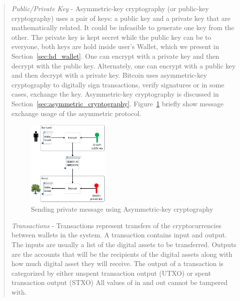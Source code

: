 \begin{itemize}
\begin{quote}
          \emph{Public/Private Key} -
          Asymmetric-key cryptography (or public-key cryptography) uses a pair of keys: a public key and a private key that are mathematically related. It could be infeasible to generate one key from the other.
          The private key is kept secret while the public key can be to everyone, both keys are hold inside user's Wallet, which we present in Section~\ref{sec:hd_wallet}.
          One can encrypt with a private key and then decrypt with the public key.
          Alternately, one can encrypt with a public key and then decrypt with a private key.
          Bitcoin uses asymmetric-key cryptography to digitally sign transactions, verify signatures or in some cases, exchange the key.
          Asymmetric-key cryptography is discussed in Section~\ref{sec:asymmetric_cryptography}.
          Figure~\ref{fig:asymmetric_cryptography} briefly show message exchange usage of the asymmetric protocol.

          \begin{figure}[ht!]
            \centering
            \includegraphics[width=0.4\textwidth]{images/asymmetric_cryptography.png}
            \caption[An example of concept of Asymmetric-key cryptography]{Sending private message using Asymmetric-key cryptography}
            \label{fig:asymmetric_cryptography}
          \end{figure}
          \bigbreak

          \emph{Transactions} - Transactions represent transfers of the cryptocurrencies between wallets in the system.
          A transaction contains input and output. The inputs are usually a list of the digital assets to be transferred.
          Outputs are	the accounts that will be the recipients of the digital assets along with how much digital asset they will receive.
          The  output  of  a  transaction  is categorized  by  either  unspent  transaction  output  (UTXO)  or spent  transaction  output  (STXO)
          All values of in and out cannot be tampered with.


\end{quote}
\end{itemize}
